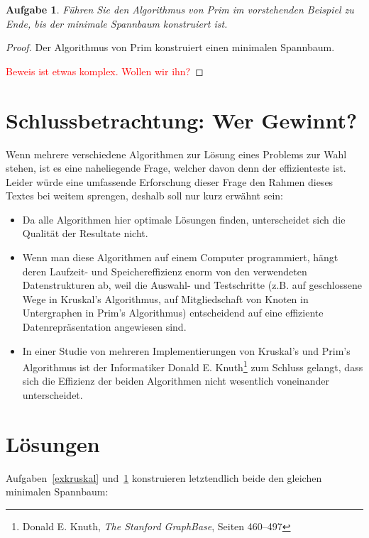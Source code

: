 \documentclass[12pt,a4paper]{report}
\theoremstyle{break}
\newtheorem{exercise}{Aufgabe}[section]
\theoremstyle{plain}
\newtheorem{proof}{Satz}[section]
\begin{document}
\begin{exercise}\label{exprim}
F\"{u}hren Sie den Algorithmus von Prim im vorstehenden Beispiel zu
Ende, bis der minimale Spannbaum konstruiert ist.
\end{exercise}

\begin{proof}\label{primproof}Der Algorithmus von Prim konstruiert
  einen minimalen Spannbaum.

\textcolor{red}{Beweis ist etwas komplex. Wollen wir ihn?}
\end{proof}

\section{Schlussbetrachtung: Wer Gewinnt?}

Wenn mehrere verschiedene Algorithmen zur L\"{o}sung eines Problems
zur Wahl stehen, ist es eine naheliegende Frage, welcher davon denn
der effizienteste ist. Leider w\"{u}rde eine umfassende Erforschung dieser
Frage den Rahmen dieses Textes bei weitem sprengen, deshalb soll nur
kurz erw\"{a}hnt sein:

\begin{itemize}
\item Da alle Algorithmen hier optimale L\"{o}sungen finden,
  unterscheidet sich die Qualit\"{a}t der Resultate nicht.
\item Wenn man diese Algorithmen auf einem Computer programmiert,
  h\"{a}ngt deren Laufzeit- und Speichereffizienz enorm von den
  verwendeten Datenstrukturen ab, weil die Auswahl- und Testschritte
  (z.B. auf geschlossene Wege in Kruskal's Algorithmus, auf
  Mitgliedschaft von Knoten in Untergraphen in Prim's Algorithmus)
  entscheidend auf eine effiziente Datenrepr\"{a}sentation angewiesen sind.
\item In einer Studie von mehreren Implementierungen von Kruskal's und
  Prim's Algorithmus ist der Informatiker Donald
  E. Knuth\footnote{Donald E. Knuth, \emph{The Stanford GraphBase},
    Seiten 460--497} zum Schluss
  gelangt, dass sich die Effizienz der beiden Algorithmen nicht
  wesentlich voneinander unterscheidet.
\end{itemize}

\section{L\"{o}sungen}

Aufgaben~\ref{exkruskal} und~\ref{exprim} konstruieren letztendlich beide
den gleichen minimalen Spannbaum:
\end{document}
